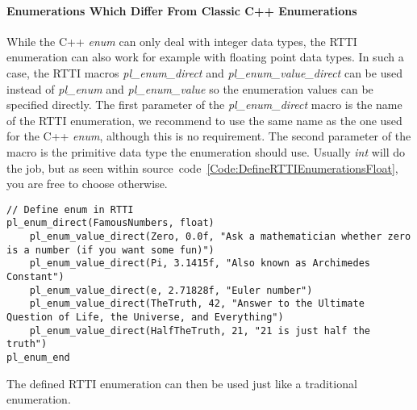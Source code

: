 \paragraph{Enumerations Which Differ From Classic C++ Enumerations}
While the C++ \emph{enum} can only deal with integer data types, the RTTI enumeration can also work for example with floating point data types. In such a case, the RTTI macros \emph{pl\_enum\_direct} and \emph{pl\_enum\_value\_direct} can be used instead of \emph{pl\_enum} and \emph{pl\_enum\_value} so the enumeration values can be specified directly. The first parameter of the \emph{pl\_enum\_direct} macro is the name of the RTTI enumeration, we recommend to use the same name as the one used for the C++ \emph{enum}, although this is no requirement. The second parameter of the macro is the primitive data type the enumeration should use. Usually \emph{int} will do the job, but as seen within source~code~\ref{Code:DefineRTTIEnumerationsFloat}, you are free to choose otherwise.
\begin{lstlisting}[label=Code:DefineRTTIEnumerationsFloat,caption={Defining RTTI enumerations which differ from classic C++ enumerations}]
// Define enum in RTTI
pl_enum_direct(FamousNumbers, float)
	pl_enum_value_direct(Zero, 0.0f, "Ask a mathematician whether zero is a number (if you want some fun)")
	pl_enum_value_direct(Pi, 3.1415f, "Also known as Archimedes Constant")
	pl_enum_value_direct(e, 2.71828f, "Euler number")
	pl_enum_value_direct(TheTruth, 42, "Answer to the Ultimate Question of Life, the Universe, and Everything")
	pl_enum_value_direct(HalfTheTruth, 21, "21 is just half the truth")
pl_enum_end
\end{lstlisting}
The defined RTTI enumeration can then be used just like a traditional enumeration.


